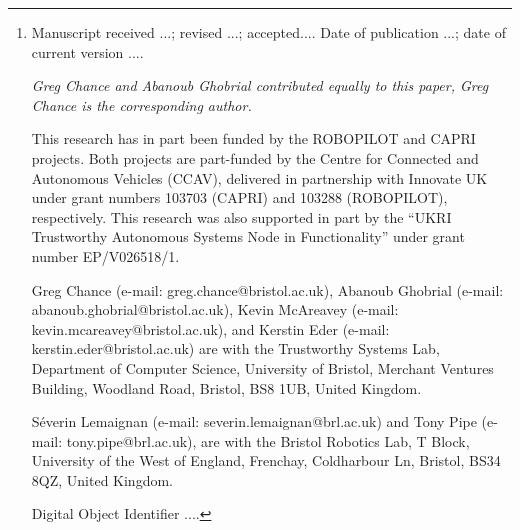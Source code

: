 \documentclass[letterpaper, 10 pt, journal, twoside]{IEEEtran}
\begin{document}
\author{Greg Chance, Abanoub Ghobrial, Kevin McAreavey, S\'everin Lemaignan, Tony Pipe, Kerstin Eder 
\thanks{{\footnotesize
Manuscript  
received ...;
revised ...;  
accepted.... 
Date of publication ...;
date of current version ....

\textit{Greg Chance and Abanoub Ghobrial contributed equally to this paper, Greg Chance is the corresponding author.}
%

This research has in part been funded by the ROBOPILOT and CAPRI projects. Both projects are part-funded by the Centre for Connected and Autonomous Vehicles (CCAV), delivered in partnership with Innovate UK under grant numbers 103703 (CAPRI) and 103288 (ROBOPILOT), respectively. 
%
This research was also supported in part by the “UKRI Trustworthy Autonomous Systems Node in Functionality” under grant number EP/V026518/1.

Greg Chance (e-mail: greg.chance@bristol.ac.uk), 
Abanoub Ghobrial (e-mail: abanoub.ghobrial@bristol.ac.uk), 
Kevin McAreavey (e-mail: kevin.mcareavey@bristol.ac.uk), 
and 
Kerstin Eder (e-mail: kerstin.eder@bristol.ac.uk) 
are with the Trustworthy Systems Lab, Department of Computer Science, University of Bristol, Merchant Ventures Building, Woodland Road, Bristol, BS8 1UB, United Kingdom. 

S\'everin Lemaignan (e-mail: severin.lemaignan@brl.ac.uk)
and
Tony Pipe (e-mail: tony.pipe@brl.ac.uk), 
are with the Bristol Robotics Lab, T Block, University of the West of England, Frenchay, Coldharbour Ln, Bristol, BS34 8QZ, United Kingdom. 

Digital Object Identifier ....
}}}
%
%
\maketitle

\begin{abstract}
\noindent 

\end{abstract}
\end{document}
